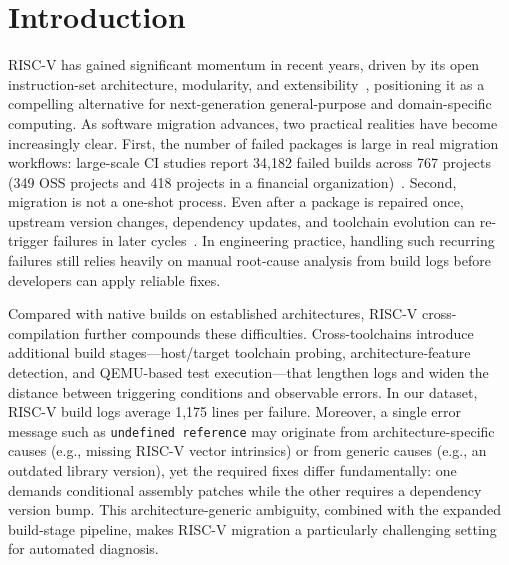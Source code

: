 \documentclass[sigconf,anonymous]{acmart}
\begin{document}
\section{Introduction}

RISC-V has gained significant momentum in recent years, driven by its open instruction-set architecture, modularity, and extensibility~\cite{cui2023risc}, positioning it as a compelling alternative for next-generation general-purpose and domain-specific computing. As software migration advances, two practical realities have become increasingly clear. First, the number of failed packages is large in real migration workflows: large-scale CI studies report 34,182 failed builds across 767 projects (349 OSS projects and 418 projects in a financial organization)~\cite{vassallo2017tale}. Second, migration is not a one-shot process. Even after a package is repaired once, upstream version changes, dependency updates, and toolchain evolution can re-trigger failures in later cycles~\cite{lou2020understanding}. In engineering practice, handling such recurring failures still relies heavily on manual root-cause analysis from build logs before developers can apply reliable fixes.

Compared with native builds on established architectures, RISC-V cross-compilation further compounds these difficulties. Cross-toolchains introduce additional build stages---host/target toolchain probing, architecture-feature detection, and QEMU-based test execution---that lengthen logs and widen the distance between triggering conditions and observable errors. In our dataset, RISC-V build logs average 1{,}175 lines per failure. Moreover, a single error message such as \texttt{undefined reference} may originate from architecture-specific causes (e.g., missing RISC-V vector intrinsics) or from generic causes (e.g., an outdated library version), yet the required fixes differ fundamentally: one demands conditional assembly patches while the other requires a dependency version bump. This architecture-generic ambiguity, combined with the expanded build-stage pipeline, makes RISC-V migration a particularly challenging setting for automated diagnosis.
\end{document}
